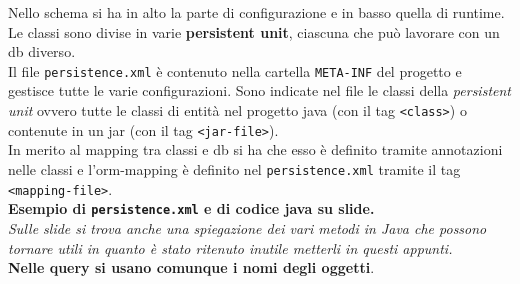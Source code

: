 \documentclass[a4paper,12pt, oneside]{book}
\begin{document}
Nello schema si ha in alto la parte di configurazione e in basso quella di
runtime. Le classi sono divise in varie \textbf{persistent unit}, ciascuna che
può lavorare con un db diverso. \\
Il file \texttt{persistence.xml} è contenuto nella cartella \texttt{META-INF}
del progetto e gestisce tutte le varie configurazioni. Sono indicate nel file le
classi della \textit{persistent unit} 
ovvero tutte le classi di entità nel progetto java (con il tag \texttt{<class>})
o contenute in un jar (con il tag \texttt{<jar-file>}).\\
In merito al mapping tra classi e db si ha che esso è definito tramite
annotazioni nelle classi e l'orm-mapping è definito nel
\texttt{persistence.xml} tramite il tag \texttt{<mapping-file>}.\\
\textbf{Esempio di \texttt{persistence.xml} e di codice java su slide.}\\
\textit{Sulle slide si trova anche una spiegazione dei vari metodi in Java che
  possono tornare utili in quanto è stato ritenuto inutile metterli in questi
  appunti.} \\
\textbf{Nelle query si usano comunque i nomi degli oggetti}.
\end{document}
